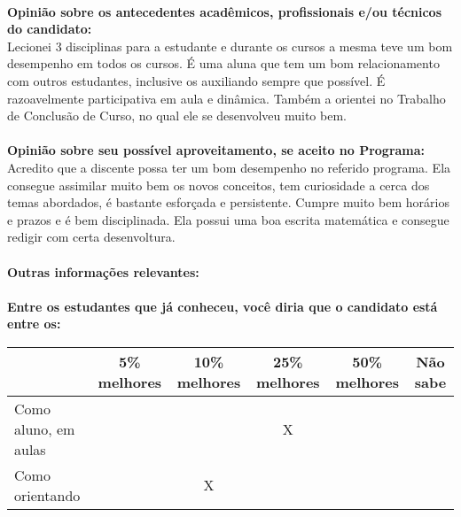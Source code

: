 \documentclass[11pt]{article}
\begin{document}
\\
\textbf{Opinião sobre os antecedentes acadêmicos, profissionais e/ou técnicos do candidato:}
\\Lecionei 3 disciplinas para a estudante e durante os cursos a mesma teve um bom desempenho em todos os cursos. É uma aluna que tem um bom relacionamento com outros estudantes, inclusive os auxiliando sempre que possível. É razoavelmente participativa em aula e dinâmica. Também a orientei no Trabalho de Conclusão de Curso, no qual ele se desenvolveu muito bem.\\
\\
\textbf{Opinião sobre seu possível aproveitamento, se aceito no Programa:}
\\Acredito que a discente possa ter um bom desempenho no referido programa. Ela consegue assimilar muito bem os novos conceitos, tem curiosidade a cerca dos temas abordados, é bastante esforçada e persistente. Cumpre muito bem horários e prazos e é bem disciplinada. Ela possui uma boa escrita matemática e consegue redigir com certa desenvoltura.\\ 
\\
\textbf{Outras informações relevantes:} \\
\\[0.3cm]
\textbf{Entre os estudantes que já conheceu, você diria que o candidato está entre os:}
\\
\begin{tabular}{|l|c|c|c|c|c|}
\hline
 & 5\% melhores & 10\% melhores & 25\% melhores & 50\% melhores & Não sabe \\
\hline
Como aluno, em aulas &  &  & X &  & \\
\hline
Como orientando &  & X &  &  & \\
\hline
\end{tabular}
\end{document}
